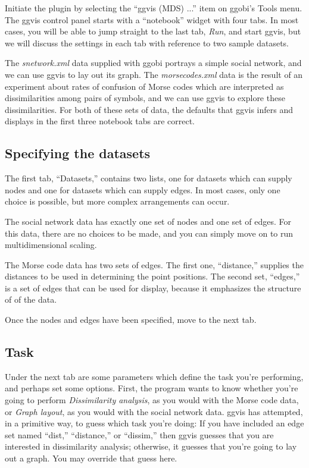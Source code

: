 \documentclass[11pt]{article}
\begin{document}
Initiate the plugin by selecting the ``ggvis (MDS) ...'' item on
ggobi's Tools menu.  The ggvis control panel starts with a
``notebook'' widget with four tabs.  In most cases, you will be
able to jump straight to the last tab, {\em Run}, and start
ggvis, but we will discuss the settings in each tab with reference
to two sample datasets.

The {\em snetwork.xml} data supplied with ggobi portrays a simple
social network, and we can use ggvis to lay out its graph.  The {\em
morsecodes.xml} data is the result of an experiment about rates of
confusion of Morse codes which are interpreted as dissimilarities
among pairs of symbols, and we can use ggvis to explore these
dissimilarities.  For both of these sets of data, the defaults that
ggvis infers and displays in the first three notebook tabs are
correct.

\subsection{Specifying the datasets}

The first tab, ``Datasets,'' contains
two lists, one for datasets which can supply nodes and one for datasets
which can supply edges.  In most cases, only one choice is possible,
but more complex arrangements can occur.

The social network data has exactly one set of nodes and one set of
edges.  For this data, there are no choices to be made, and you can
simply move on to run multidimensional scaling.

The Morse code data has two sets of edges.  The first one,
``distance,'' supplies the distances to be used in determining the
point positions.  The second set, ``edges,'' is a set of edges that
can be used for display, because it emphasizes the structure of of
the data.

Once the nodes and edges have been specified, move to the next tab.

\subsection{Task}

Under the next tab are some parameters which define the task
you're performing, and perhaps set some options.  First, the program
wants to know whether you're going to perform {\em Dissimilarity
analysis}, as you would with the Morse code data, or {\em Graph
layout}, as you would with the social network data.  ggvis has
attempted, in a primitive way, to guess which task you're doing:
If you have included an edge set named ``dist,'' ``distance,'' or
``dissim,'' then ggvis guesses that you are interested in
dissimilarity analysis; otherwise, it guesses that you're going
to lay out a graph.  You may override that guess here.
\end{document}
